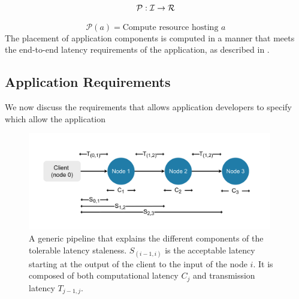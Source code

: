 \begin{equation}
\label{eq:placement_domain_eqn}
\mathcal{P} : \mathcal{I} \rightarrow \mathcal{R}
\end{equation}

\begin{equation}
\label{eq:placement_eqn}
\mathcal{P} \left( a \right) = \text{Compute resource hosting }a
\end{equation}
The placement of application components is computed in a manner that meets the end-to-end latency requirements of the application, as described in \label{sec:oneedge_app_reqs}.

\subsection{Application Requirements}
\label{sec:oneedge_app_reqs}
We now discuss the requirements that \oneedge{} allows application developers to specify which allow the application
\begin{figure}
	\centering
	\includegraphics[width=0.95\textwidth]{figures/oneedge/pipeline_latency.pdf}
    \caption{
    A generic pipeline that explains the different components of the tolerable latency staleness. $S_{(i-1,i)}$ is the acceptable latency starting at the output of the client to the input of the node $i$. It is composed of both computational latency $C_j$ and transmission latency $T_{j-1,j}$.}
	\label{fig:pipeline_lat}
\end{figure}

